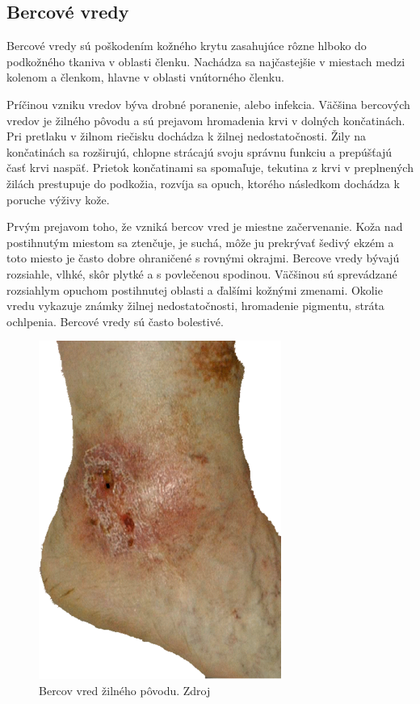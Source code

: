 \subsection{Bercové vredy}
Bercové vredy sú poškodením kožného krytu zasahujúce rôzne hlboko do podkožného tkaniva v oblasti členku. Nachádza sa najčastejšie v miestach medzi kolenom a členkom, hlavne v oblasti vnútorného členku.

Príčinou vzniku vredov býva drobné poranenie, alebo infekcia. Väčšina bercových vredov je žilného pôvodu a sú prejavom hromadenia krvi v dolných končatinách. Pri pretlaku v žilnom riečisku dochádza k žilnej nedostatočnosti. Žily na končatinách sa rozširujú, chlopne strácajú svoju správnu funkciu a prepúšťajú časť krvi naspäť. Prietok končatinami sa spomaľuje, tekutina z krvi v preplnených žilách prestupuje do podkožia, rozvíja sa opuch, ktorého následkom dochádza k poruche výživy kože. 

Prvým prejavom toho, že vzniká bercov vred je miestne začervenanie. Koža nad postihnutým miestom sa ztenčuje, je suchá, môže ju prekrývať šedivý ekzém a toto miesto je často dobre ohraničené s rovnými okrajmi. Bercove vredy bývajú rozsiahle, vlhké, skôr plytké a s povlečenou spodinou. Väčšinou sú sprevádzané rozsiahlym opuchom postihnutej oblasti a ďalšími kožnými zmenami. Okolie vredu vykazuje známky žilnej nedostatočnosti, hromadenie pigmentu, stráta ochlpenia. Bercové vredy sú často bolestivé.
\begin{figure}[h]
  \centering
  \includegraphics[scale=0.50]{fig/bercov-vred.png}
  \caption{Bercov vred žilného pôvodu. Zdroj \cite{BsyXZC783dJbfdc7}}
  \label{fig:bercov-vred}
\end{figure}

